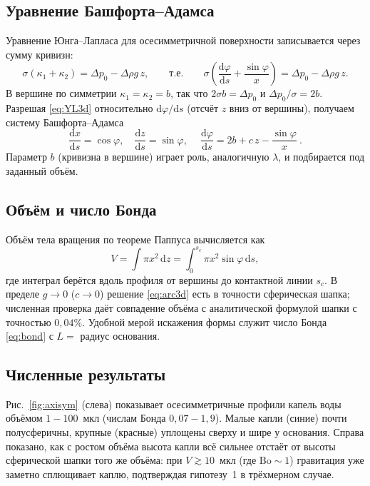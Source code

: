 \documentclass[11pt]{article}
\newcommand{\Bo}{\mathrm{Bo}}
\newcommand{\rd}{\mathrm{d}}
\newcommand{\dd}[2]{\frac{\rd #1}{\rd #2}}
\theoremstyle{definition}
\begin{document}
\subsection{Уравнение Башфорта--Адамса}
Уравнение Юнга--Лапласа для осесимметричной поверхности записывается через сумму
кривизн:
\begin{equation}
\sigma(\kappa_{1}+\kappa_{2})=\Delta p_{0}-\Delta\rho g\,z,
\qquad\text{т.е.}\qquad
\sigma\!\left(\dd{\varphi}{s}+\frac{\sin\varphi}{x}\right)=\Delta p_{0}-\Delta\rho g\,z .
\label{eq:YL3d}
\end{equation}
В вершине по симметрии $\kappa_{1}=\kappa_{2}=b$, так что
$2\sigma b=\Delta p_{0}$ и $\Delta p_{0}/\sigma=2b$. Разрешая \eqref{eq:YL3d}
относительно $\rd\varphi/\rd s$ (отсчёт $z$ вниз от вершины), получаем систему
Башфорта--Адамса
\begin{equation}
\dd{x}{s}=\cos\varphi,\quad
\dd{z}{s}=\sin\varphi,\quad
\boxed{\ \dd{\varphi}{s}=2b+c\,z-\frac{\sin\varphi}{x}\ }.
\label{eq:arc3d}
\end{equation}
Параметр $b$ (кривизна в вершине) играет роль, аналогичную $\lambda$, и
подбирается под заданный объём.

\subsection{Объём и число Бонда}
Объём тела вращения по теореме Паппуса вычисляется как
\begin{equation}
V=\int \pi x^{2}\,\rd z=\int_{0}^{s_{\!c}}\pi x^{2}\sin\varphi\,\rd s,
\label{eq:vol3d}
\end{equation}
где интеграл берётся вдоль профиля от вершины до контактной линии $s_c$.
В пределе $g\to 0$ ($c\to 0$) решение \eqref{eq:arc3d} есть в точности сферическая
шапка; численная проверка даёт совпадение объёма с аналитической формулой шапки
с точностью $0{,}04\%$. Удобной мерой искажения формы служит число Бонда
\eqref{eq:bond} с $L=$ радиус основания.

\subsection{Численные результаты}
Рис.~\ref{fig:axisym} (слева) показывает осесимметричные профили капель воды
объёмом $1\!-\!100$~мкл (числам Бонда $0{,}07\!-\!1{,}9$). Малые капли (синие)
почти полусферичны, крупные (красные) уплощены сверху и шире у основания. Справа
показано, как с ростом объёма высота капли всё сильнее отстаёт от высоты
сферической шапки того же объёма: при $V\gtrsim 10$~мкл (где $\Bo\sim 1$)
гравитация уже заметно сплющивает каплю, подтверждая гипотезу~1 в трёхмерном
случае.
\end{document}
